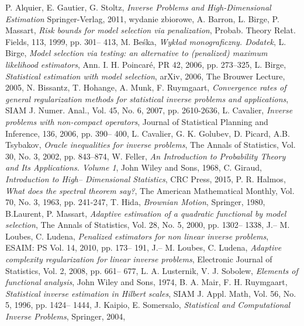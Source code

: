 \documentclass{mwart}
\begin{document}
\begin{thebibliography}{100}
 P. Alquier,	E. Gautier, G. Stoltz, \emph{Inverse Problems and High-Dimensional Estimation}	Springer-Verlag, 2011, wydanie zbiorowe,
 A. Barron, L. Birge, P. Massart, \emph{Risk bounds for model selection via penalization}, Probab. Theory Relat. Fields, 113, 1999, pp. 301-- 413,
 M. Beśka, \emph{Wykład monograficzny. Dodatek},
 L. Birge, \emph{Model selection via testing: an alternative to (penalized) maximum likelihood estimators}, Ann. I. H. Poincaré, PR 42, 2006, pp. 273–325,
 L. Birge, \emph{Statistical estimation with model selection}, arXiv, 2006, The Brouwer Lecture, 2005,
 N. Bissantz, T. Hohange, A. Munk, F. Ruymgaart, \emph{Convergence rates of general regularization methods for statistical inverse problems and applications}, SIAM J. Numer. Anal., Vol. 45, No. 6, 2007, pp. 2610-2636,
  L. Cavalier, \emph{Inverse problems with non-compact operators}, Journal of Statistical Planning and
Inference, 136, 2006, pp. 390-- 400,
 L. Cavalier, G. K. Golubev, D. Picard, A.B. Tsybakov, \emph{Oracle inequalities for inverse problems}, The Annals of Statistics, Vol. 30, No. 3, 2002, pp. 843–874,	
 W. Feller, \emph{An Introduction to Probability Theory and Its Applications. Volume 1}, John Wiley and Sons, 1968,
 C. Giraud, \emph{Introduction to High-- Dimensional Statistics}, CRC Press, 2015,
  P. R. Halmos, \emph{What does the spectral theorem say?}, The American Mathematical Monthly, Vol. 70, No. 3, 1963, pp. 241-247,
 T. Hida, \emph{Brownian Motion}, Springer, 1980,
 B.Laurent, P. Massart, \emph{Adaptive estimation of a quadratic functional by model selection}, The Annals of Statistics, Vol. 28, No. 5, 2000, pp. 1302-- 1338,
 J.-- M. Loubes, C. Ludena, \emph{Penalized estimators for non linear inverse problems}, ESAIM: PS Vol. 14, 2010, pp. 173-- 191,
 J.-- M. Loubes, C. Ludena, \emph{Adaptive complexity regularization for linear inverse problems}, Electronic Journal of Statistics, Vol. 2, 2008, pp. 661-- 677, 
 L. A. Lusternik, V. J. Sobolew, \emph{Elements of functional analysis}, John Wiley and Sons, 1974,
 B. A. Mair, F. H. Ruymgaart, \emph{Statistical inverse estimation in Hilbert scales}, SIAM J. Appl. Math, Vol. 56, No. 5, 1996, pp. 1424-- 1444,
J. Kaipio, E. Somersalo, \emph{Statistical and Computational Inverse Problems}, Springer, 2004,

\end{thebibliography}
\end{document}
